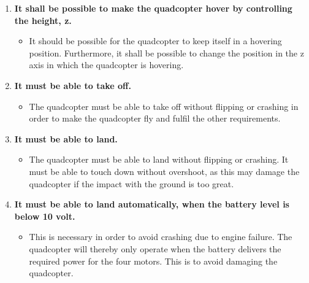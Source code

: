 \begin{enumerate}[label=\textbf{\arabic*})]
\item \textbf{It shall be possible to make the quadcopter hover by controlling the height, z.}
\begin{itemize}
\item[] It should be possible for the quadcopter to keep itself in a hovering position. Furthermore, it shall be possible to change the position in the z axis in which the quadcopter is hovering.
\end{itemize}


\item \textbf{It must be able to take off.}
\begin{itemize}
\item[]The quadcopter must be able to take off without flipping or crashing in order to make the quadcopter fly and fulfil the other requirements.
\end{itemize}
\newpage
\item \textbf{It must be able to land.}
\begin{itemize}
\item[]The quadcopter must be able to land without flipping or crashing. It must be able to touch down without overshoot, as this may damage the quadcopter if the impact with the ground is too great.
\end{itemize}


\item \textbf{It must be able to land automatically, when the battery level is below 10 volt.}
\begin{itemize}
\item[] This is necessary in order to avoid crashing due to engine failure. The quadcopter will thereby only operate when the battery delivers the required power for the four motors. This is to avoid damaging the quadcopter.
\end{itemize}

\end{enumerate}



